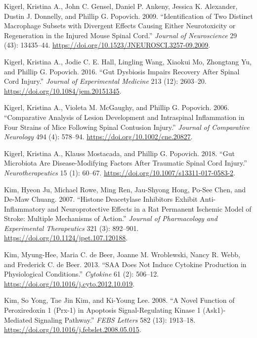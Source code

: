\documentclass[9pt,lineno]{elife}
\newlength{\cslhangindent}
\newlength{\cslentryspacingunit} %
\newenvironment{CSLReferences}[2] %
 {%
  \setlength{\parindent}{0pt}
  \ifodd #1
  \let\oldpar\par
  \def\par{\hangindent=\cslhangindent\oldpar}
  \fi
  \setlength{\parskip}{#2\cslentryspacingunit}
 }%
 {}
\begin{document}
\begin{landscape}
\begin{landscape}
\begin{landscape}
\begin{landscape}
\begin{CSLReferences}{1}{0}
\leavevmode{}%
Kigerl, Kristina A., John C. Gensel, Daniel P. Ankeny, Jessica K. Alexander, Dustin J. Donnelly, and Phillip G. Popovich. 2009. {``Identification of {Two Distinct Macrophage Subsets} with {Divergent Effects Causing} Either {Neurotoxicity} or {Regeneration} in the {Injured Mouse Spinal Cord}.''} \emph{Journal of Neuroscience} 29 (43): 13435--44. \url{https://doi.org/10.1523/JNEUROSCI.3257-09.2009}.

\leavevmode{}%
Kigerl, Kristina A., Jodie C. E. Hall, Lingling Wang, Xiaokui Mo, Zhongtang Yu, and Phillip G. Popovich. 2016. {``Gut Dysbiosis Impairs Recovery After Spinal Cord Injury.''} \emph{Journal of Experimental Medicine} 213 (12): 2603--20. \url{https://doi.org/10.1084/jem.20151345}.

\leavevmode{}%
Kigerl, Kristina A., Violeta M. McGaughy, and Phillip G. Popovich. 2006. {``Comparative Analysis of Lesion Development and Intraspinal Inflammation in Four Strains of Mice Following Spinal Contusion Injury.''} \emph{Journal of Comparative Neurology} 494 (4): 578--94. \url{https://doi.org/10.1002/cne.20827}.

\leavevmode{}%
Kigerl, Kristina A., Klauss Mostacada, and Phillip G. Popovich. 2018. {``Gut {Microbiota Are Disease-Modifying Factors After Traumatic Spinal Cord Injury}.''} \emph{Neurotherapeutics} 15 (1): 60--67. \url{https://doi.org/10.1007/s13311-017-0583-2}.

\leavevmode{}%
Kim, Hyeon Ju, Michael Rowe, Ming Ren, Jau-Shyong Hong, Po-See Chen, and De-Maw Chuang. 2007. {``Histone {Deacetylase Inhibitors Exhibit Anti-Inflammatory} and {Neuroprotective Effects} in a {Rat Permanent Ischemic Model} of {Stroke}: {Multiple Mechanisms} of {Action}.''} \emph{Journal of Pharmacology and Experimental Therapeutics} 321 (3): 892--901. \url{https://doi.org/10.1124/jpet.107.120188}.

\leavevmode{}%
Kim, Myung-Hee, Maria C. de Beer, Joanne M. Wroblewski, Nancy R. Webb, and Frederick C. de Beer. 2013. {``{SAA} Does Not Induce Cytokine Production in Physiological Conditions.''} \emph{Cytokine} 61 (2): 506--12. \url{https://doi.org/10.1016/j.cyto.2012.10.019}.

\leavevmode{}%
Kim, So Yong, Tae Jin Kim, and Ki-Young Lee. 2008. {``A Novel Function of Peroxiredoxin 1 ({Prx-1}) in Apoptosis Signal-Regulating Kinase 1 ({Ask1})-Mediated Signaling Pathway.''} \emph{FEBS Letters} 582 (13): 1913--18. \url{https://doi.org/10.1016/j.febslet.2008.05.015}.


\end{CSLReferences}
\end{landscape}
\end{landscape}
\end{landscape}
\end{landscape}
\end{document}
